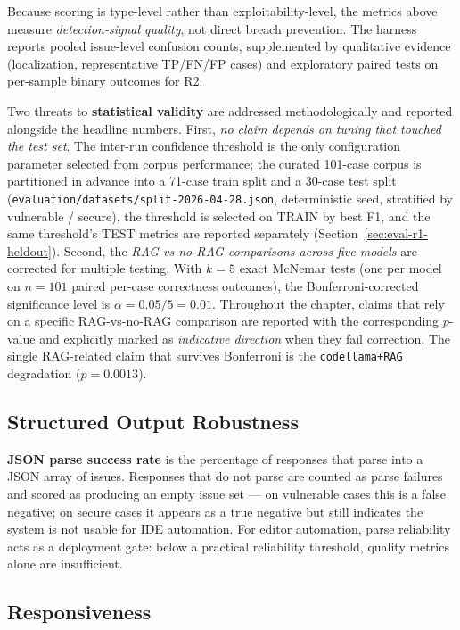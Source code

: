 Because scoring is type-level rather than exploitability-level, the metrics above measure \emph{detection-signal quality}, not direct breach prevention. The harness reports pooled issue-level confusion counts, supplemented by qualitative evidence (localization, representative TP/FN/FP cases) and exploratory paired tests on per-sample binary outcomes for R2.

Two threats to \textbf{statistical validity} are addressed methodologically and reported alongside the headline numbers. First, \emph{no claim depends on tuning that touched the test set}. The inter-run confidence threshold is the only configuration parameter selected from corpus performance; the curated 101-case corpus is partitioned in advance into a 71-case train split and a 30-case test split (\texttt{evaluation/datasets/split-2026-04-28.json}, deterministic seed, stratified by vulnerable / secure), the threshold is selected on TRAIN by best F1, and the same threshold's TEST metrics are reported separately (Section~\ref{sec:eval-r1-heldout}). Second, the \emph{RAG-vs-no-RAG comparisons across five models} are corrected for multiple testing. With $k = 5$ exact McNemar tests (one per model on $n = 101$ paired per-case correctness outcomes), the Bonferroni-corrected significance level is $\alpha = 0.05/5 = 0.01$. Throughout the chapter, claims that rely on a specific RAG-vs-no-RAG comparison are reported with the corresponding $p$-value and explicitly marked as \emph{indicative direction} when they fail correction. The single RAG-related claim that survives Bonferroni is the \texttt{codellama+RAG} degradation ($p = 0.0013$).

\subsection{Structured Output Robustness}
\label{subsec:eval-metrics-output}

\textbf{JSON parse success rate} is the percentage of responses that parse into a JSON array of issues. Responses that do not parse are counted as parse failures and scored as producing an empty issue set --- on vulnerable cases this is a false negative; on secure cases it appears as a true negative but still indicates the system is not usable for IDE automation. For editor automation, parse reliability acts as a deployment gate: below a practical reliability threshold, quality metrics alone are insufficient.

\subsection{Responsiveness}
\label{subsec:eval-metrics-responsiveness}

